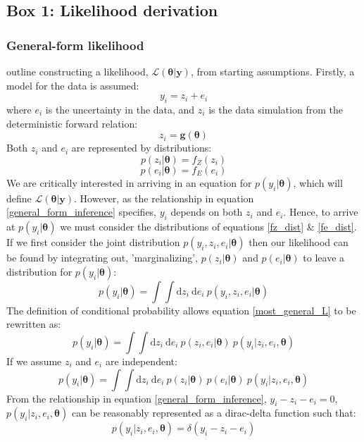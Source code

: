 \begin{tcolorbox}
\chapter{Box 1: Likelihood derivation}
\label{Box1}

\subsection{General-form likelihood}
\citet[p.90-92]{gregory2005bayesian} outline constructing a likelihood, $\mathcal{L}(\bm{\theta}|\bm{y})$, from starting assumptions. Firstly, a model for the data is assumed:
\begin{equation}
y_i = z_i + e_i
\label{general_form_inference}
\end{equation}
where $e_i$ is the uncertainty in the data, and $z_i$ is the data simulation from the deterministic forward relation:
\begin{equation}
z_i = \bm{g}(\bm{\theta})
\end{equation}
Both $z_i$ and $e_i$ are represented by distributions:
\begin{equation}
p(z_i|\bm{\theta}) = f_Z(z_i)
\label{fz_dist}
\end{equation}
\begin{equation}
p(e_i|\bm{\theta}) = f_E(e_i)
\label{fe_dist}
\end{equation}
We are critically interested in arriving in an equation for $p(y_i|\bm{\theta})$, which will define $\mathcal{L}(\bm{\theta}|\bm{y})$. However, as the relationship in equation \ref{general_form_inference} specifies, $y_i$ depends on both $z_i$ and $e_i$. Hence, to arrive at $p(y_i|\bm{\theta})$ we must consider the distributions of equations \ref{fz_dist} \& \ref{fe_dist}. If we first consider the joint distribution $p(y_i,z_i,e_i|\bm{\theta})$ then our likelihood can be found by integrating out, 'marginalizing', $p(z_i|\bm{\theta})$ and $p(e_i|\bm{\theta})$ to leave a distribution for $p(y_i|\bm{\theta})$:
\begin{equation}
p(y_i|\bm{\theta}) = \int \int \text{d}z_i\ \text{d}e_i\ p(y_i,z_i,e_i|\bm{\theta})
\label{most_general_L}
\end{equation}
The definition of conditional probability allows equation \ref{most_general_L} to be rewritten as:
\begin{equation}
p(y_i|\bm{\theta}) = \int \int \text{d}z_i\ \text{d}e_i\ p(z_i,e_i|\bm{\theta})\ p(y_i|z_i,e_i,\bm{\theta})
\end{equation}
If we assume $z_i$ and $e_i$ are independent:
\begin{equation}
p(y_i|\bm{\theta}) = \int \int \text{d}z_i\ \text{d}e_i\ p(z_i|\bm{\theta})\ p(e_i|\bm{\theta})\ p(y_i|z_i,e_i,\bm{\theta})
\label{halfway_through_derivation}
\end{equation}
From the relationship in equation \ref{general_form_inference}, $y_i-z_i-e_i = 0$, $p(y_i|z_i,e_i,\bm{\theta})$ can be reasonably represented as a dirac-delta function such that:
\begin{equation}
p(y_i|z_i,e_i,\bm{\theta}) = \delta(y_i-z_i-e_i)
\label{dirac_equality}
\end{equation}


\end{tcolorbox}
